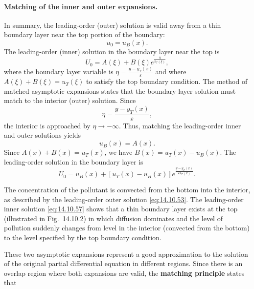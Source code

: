 \paragraph{Matching of the inner and outer expansions.}
In summary, the leading-order (outer) solution is valid away from a thin boundary layer near the top portion of the boundary:
\begin{equation}
u_0 = u_B(x).
\label{eq:14.10.53}
\end{equation}
The leading-order (inner) solution in the boundary layer near the top is
\begin{equation}
U_0 = A(\xi) + B(\xi)e^{\frac{\eta}{k_T(\xi)}},
\label{eq:14.10.54}
\end{equation}
where the boundary layer variable is $\eta = \frac{y - y_T(x)}{\varepsilon}$ and where $A(\xi) + B(\xi) = u_T(\xi)$ to satisfy the top boundary condition. The method of matched asymptotic expansions states that the boundary layer solution must match to the interior (outer) solution. Since
\begin{equation}
\eta = \frac{y - y_T(x)}{\varepsilon},
\label{eq:14.10.55}
\end{equation}
the interior is approached by $\eta \to -\infty$. Thus, matching the leading-order inner and outer solutions yields
\begin{equation}
u_B(x) = A(x).
\label{eq:14.10.56}
\end{equation}
Since $A(x) + B(x) = u_T(x)$, we have $B(x) = u_T(x) - u_B(x)$. The leading-order solution in the boundary layer is
\begin{equation}
U_0 = u_B(x) + [u_T(x) - u_B(x)]e^{\frac{y - y_T(x)}{\varepsilon k_T(x)}}.
\label{eq:14.10.57}
\end{equation}

The concentration of the pollutant is convected from the bottom into the interior, as described by the leading-order outer solution \eqref{eq:14.10.53}. The leading-order inner solution \eqref{eq:14.10.57} shows that a thin boundary layer exists at the top (illustrated in Fig.\ 14.10.2) in which diffusion dominates and the level of pollution suddenly changes from level in the interior (convected from the bottom) to the level specified by the top boundary condition.

These two asymptotic expansions represent a good approximation to the solution of the original partial differential equation in different regions. Since there is an overlap region where both expansions are valid, the \textbf{matching principle} states that
\begin{center}
\end{center}

